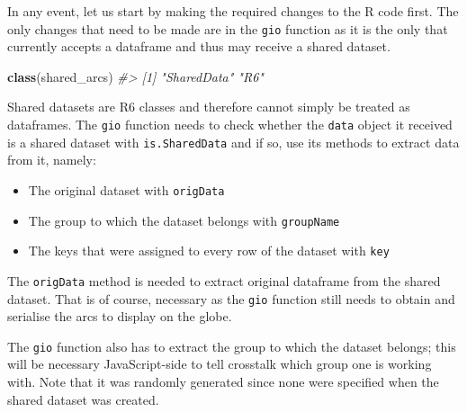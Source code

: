 \documentclass[
  10pt,
]{krantz}
\makeatletter
\newenvironment{Shaded}{\begin{snugshade}}{\end{snugshade}}
\newcommand{\CommentTok}[1]{\textcolor[rgb]{0.37,0.37,0.37}{\textit{#1}}}
\newcommand{\KeywordTok}[1]{\textcolor[rgb]{0.27,0.27,0.27}{\textbf{#1}}}
\newcommand{\NormalTok}[1]{#1}
\newcommand{\OperatorTok}[1]{\textcolor[rgb]{0.43,0.43,0.43}{\textbf{#1}}}
\providecommand{\tightlist}{%
  \setlength{\itemsep}{0pt}\setlength{\parskip}{0pt}}
\newenvironment{kframe}{%
\medskip{}
\setlength{\fboxsep}{.8em}
 \def\at@end@of@kframe{}%
 \ifinner\ifhmode%
  \def\at@end@of@kframe{\end{minipage}}%
  \begin{minipage}{\columnwidth}%
 \fi\fi%
 \def\FrameCommand##1{\hskip\@totalleftmargin \hskip-\fboxsep
 \colorbox{shadecolor}{##1}\hskip-\fboxsep
     \hskip-\linewidth \hskip-\@totalleftmargin \hskip\columnwidth}%
 \MakeFramed {\advance\hsize-\width
   \@totalleftmargin\z@ \linewidth\hsize
   \@setminipage}}%
 {\par\unskip\endMakeFramed%
 \at@end@of@kframe}
\renewenvironment{Shaded}{\begin{kframe}}{\end{kframe}}
\makeatother
\begin{document}
In any event, let us start by making the required changes to the R code first. The only changes that need to be made are in the \texttt{gio} function as it is the only that currently accepts a dataframe and thus may receive a shared dataset.

\begin{Shaded}
\begin{Highlighting}[]
\KeywordTok{class}\NormalTok{(shared\_arcs)}
\CommentTok{\#> [1] "SharedData" "R6"}
\end{Highlighting}
\end{Shaded}

Shared datasets are R6 classes and therefore cannot simply be treated as dataframes. The \texttt{gio} function needs to check whether the \texttt{data} object it received is a shared dataset with \texttt{is.SharedData} and if so, use its methods to extract data from it, namely:

\begin{itemize}
\tightlist
\item
  The original dataset with \texttt{origData}
\item
  The group to which the dataset belongs with \texttt{groupName}
\item
  The keys that were assigned to every row of the dataset with \texttt{key}
\end{itemize}

The \texttt{origData} method is needed to extract original dataframe from the shared dataset. That is of course, necessary as the \texttt{gio} function still needs to obtain and serialise the arcs to display on the globe.

\begin{Shaded}
\end{Shaded}

The \texttt{gio} function also has to extract the group to which the dataset belongs; this will be necessary JavaScript-side to tell crosstalk which group one is working with. Note that it was randomly generated since none were specified when the shared dataset was created.

\begin{Shaded}
\end{Shaded}
\end{document}
